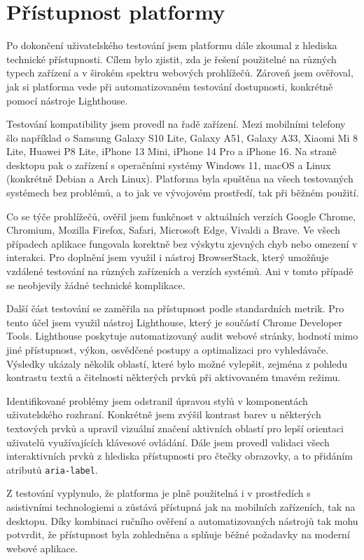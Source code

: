 \section{Přístupnost platformy}

Po dokončení uživatelského testování jsem platformu dále zkoumal z hlediska technické přístupnosti. 
Cílem bylo zjistit, zda je řešení použitelné na různých typech zařízení a v širokém spektru webových prohlížečů. 
Zároveň jsem ověřoval, jak si platforma vede při automatizovaném testování dostupnosti, konkrétně pomocí nástroje Lighthouse.

Testování kompatibility jsem provedl na řadě zařízení. 
Mezi mobilními telefony šlo například o Samsung Galaxy S10 Lite, Galaxy A51, Galaxy A33, Xiaomi Mi 8 Lite, Huawei P8 Lite, iPhone 13 Mini, iPhone 14 Pro a iPhone 16. 
Na straně desktopu pak o zařízení s operačními systémy Windows 11, macOS a Linux (konkrétně Debian a Arch Linux). 
Platforma byla spuštěna na všech testovaných systémech bez problémů, a to jak ve vývojovém prostředí, tak při běžném použití.

Co se týče prohlížečů, ověřil jsem funkčnost v aktuálních verzích Google Chrome, Chromium, Mozilla Firefox, Safari, Microsoft Edge, Vivaldi a Brave. 
Ve všech případech aplikace fungovala korektně bez výskytu zjevných chyb nebo omezení v interakci. 
Pro doplnění jsem využil i nástroj BrowserStack, který umožňuje vzdálené testování na různých zařízeních a verzích systémů. Ani v tomto případě se neobjevily žádné technické komplikace.

Další část testování se zaměřila na přístupnost podle standardních metrik. 
Pro tento účel jsem využil nástroj Lighthouse, který je součástí Chrome Developer Tools. 
Lighthouse poskytuje automatizovaný audit webové stránky, hodnotí mimo jiné přístupnost, výkon, osvědčené postupy a optimalizaci pro vyhledávače. 
Výsledky ukázaly několik oblastí, které bylo možné vylepšit, zejména z pohledu kontrastu textů a čitelnosti některých prvků při aktivovaném tmavém režimu.

Identifikované problémy jsem odstranil úpravou stylů v komponentách uživatelského rozhraní. 
Konkrétně jsem zvýšil kontrast barev u některých textových prvků a upravil vizuální značení aktivních oblastí pro lepší orientaci uživatelů využívajících klávesové ovládání.
Dále jsem provedl validaci všech interaktivních prvků z hlediska přístupnosti pro čtečky obrazovky, a to přidáním atributů \texttt{aria-label}.

Z testování vyplynulo, že platforma je plně použitelná i v prostředích s asistivními technologiemi a zůstává přístupná jak na mobilních zařízeních, tak na desktopu.
Díky kombinaci ručního ověření a automatizovaných nástrojů tak mohu potvrdit, že přístupnost byla zohledněna a splňuje běžné požadavky na moderní webové aplikace.

